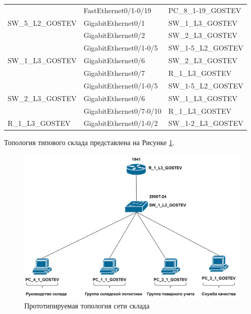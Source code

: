 \documentclass[14pt, a4paper]{extarticle}
\numberwithin{equation}{section}
\begin{document}
\begin{table}[H]
\begin{tabular}{|l|l|l|}
\multirow{3}{*}{SW\_5\_L2\_GOSTEV} & FastEthernet0/1-0/19   & PC\_8\_1-19\_GOSTEV           \\ \cline{2-3} 
                                   & GigabitEthernet0/1     & SW\_1\_L3\_GOSTEV             \\ \cline{2-3} 
                                   & GigabitEthernet0/2     & SW\_2\_L3\_GOSTEV             \\ \hline
\multirow{3}{*}{SW\_1\_L3\_GOSTEV} & GigabitEthernet0/1-0/5 & SW\_1-5\_L2\_GOSTEV           \\ \cline{2-3} 
                                   & GigabitEthernet0/6     & SW\_2\_L3\_GOSTEV             \\ \cline{2-3} 
                                   & GigabitEthernet0/7     & R\_1\_L3\_GOSTEV              \\ \hline
\multirow{3}{*}{SW\_2\_L3\_GOSTEV} & GigabitEthernet0/1-0/5 & SW\_1-5\_L2\_GOSTEV           \\ \cline{2-3} 
                                   & GigabitEthernet0/6     & SW\_1\_L3\_GOSTEV             \\ \cline{2-3} 
                                   & GigabitEthernet0/7-0/10     & R\_1\_L3\_GOSTEV              \\ \hline
R\_1\_L3\_GOSTEV                   & GigabitEthernet0/1-0/2 & SW\_1-2\_L3\_GOSTEV           \\ \hline
\end{tabular}
\end{table}



\newpage
Топология типового склада представлена на Рисунке \ref{fig:warehouseTopo}.
\begin{figure}[H]
        \centering
        \includegraphics[scale=0.2]{topo_warehouse.png}
        \caption{Прототипируемая топология сети склада}
        \label{fig:warehouseTopo}
\end{figure}
\end{document}
